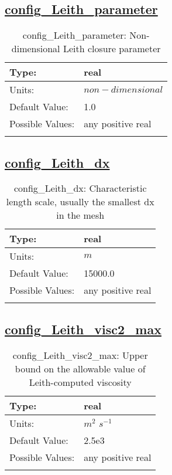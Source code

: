 \subsection[config\_Leith\_parameter]{\hyperref[sec:nm_tab_hmix_Leith]{config\_Leith\_parameter}}
\label{subsec:nm_sec_config_Leith_parameter}
\begin{center}
\begin{longtable}{| p{2.0in} || p{4.0in} |}
    \hline
    Type: & real \\
    \hline
    Units: & $non-dimensional$ \\
    \hline
    Default Value: & 1.0 \\
    \hline
    Possible Values: & any positive real \\
    \hline
    \caption{config\_Leith\_parameter: Non-dimensional Leith closure parameter}
\end{longtable}
\end{center}
\subsection[config\_Leith\_dx]{\hyperref[sec:nm_tab_hmix_Leith]{config\_Leith\_dx}}
\label{subsec:nm_sec_config_Leith_dx}
\begin{center}
\begin{longtable}{| p{2.0in} || p{4.0in} |}
    \hline
    Type: & real \\
    \hline
    Units: & $m$ \\
    \hline
    Default Value: & 15000.0 \\
    \hline
    Possible Values: & any positive real \\
    \hline
    \caption{config\_Leith\_dx: Characteristic length scale, usually the smallest dx in the mesh}
\end{longtable}
\end{center}
\subsection[config\_Leith\_visc2\_max]{\hyperref[sec:nm_tab_hmix_Leith]{config\_Leith\_visc2\_max}}
\label{subsec:nm_sec_config_Leith_visc2_max}
\begin{center}
\begin{longtable}{| p{2.0in} || p{4.0in} |}
    \hline
    Type: & real \\
    \hline
    Units: & $m^2$ $s^{-1}$ \\
    \hline
    Default Value: & 2.5e3 \\
    \hline
    Possible Values: & any positive real \\
    \hline
    \caption{config\_Leith\_visc2\_max: Upper bound on the allowable value of Leith-computed viscosity}
\end{longtable}
\end{center}
